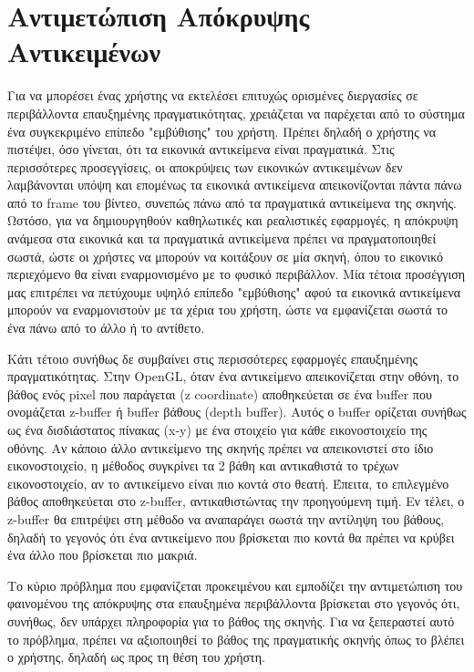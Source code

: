 \section{Αντιμετώπιση Απόκρυψης Αντικειμένων} \label{s:occlusion}



Για να μπορέσει ένας χρήστης να εκτελέσει επιτυχώς ορισμένες διεργασίες σε περιβάλλοντα επαυξημένης πραγματικότητας, χρειάζεται να παρέχεται από το σύστημα ένα συγκεκριμένο επίπεδο "εμβύθισης" του χρήστη. Πρέπει δηλαδή ο χρήστης να πιστέψει, όσο γίνεται, ότι τα εικονικά αντικείμενα είναι πραγματικά. 
Στις περισσότερες προσεγγίσεις, οι αποκρύψεις των εικονικών αντικειμένων δεν λαμβάνονται υπόψη και επομένως τα εικονικά αντικείμενα απεικονίζονται πάντα πάνω από το frame του βίντεο, συνεπώς πάνω από τα πραγματικά αντικείμενα της σκηνής. 
Ωστόσο, για να δημιουργηθούν καθηλωτικές και ρεαλιστικές εφαρμογές, η απόκρυψη ανάμεσα στα εικονικά και τα πραγματικά αντικείμενα πρέπει να πραγματοποιηθεί σωστά, ώστε οι χρήστες να μπορούν να κοιτάξουν σε μία σκηνή, όπου το εικονικό περιεχόμενο θα είναι εναρμονισμένο με το φυσικό περιβάλλον. Μία τέτοια προσέγγιση μας επιτρέπει να πετύχουμε υψηλό επίπεδο "εμβύθισης" αφού τα εικονικά αντικείμενα μπορούν να εναρμονιστούν με τα χέρια του χρήστη, ώστε να εμφανίζεται σωστά το ένα πάνω από το άλλο ή το αντίθετο. 

Κάτι τέτοιο συνήθως δε συμβαίνει στις περισσότερες εφαρμογές επαυξημένης πραγματικότητας. Στην OpenGL, όταν ένα αντικείμενο απεικονίζεται στην οθόνη, το βάθος ενός pixel που παράγεται (z coordinate) αποθηκεύεται σε ένα buffer που ονομάζεται z-buffer ή buffer βάθους (depth buffer). Αυτός ο buffer ορίζεται συνήθως ως ένα δισδιάστατος πίνακας (x-y) με ένα στοιχείο για κάθε εικονοστοιχείο της οθόνης. Αν κάποιο άλλο αντικείμενο της σκηνής πρέπει να απεικονιστεί στο ίδιο εικονοστοιχείο, η μέθοδος συγκρίνει τα 2 βάθη και αντικαθιστά το τρέχων εικονοστοιχείο, αν το αντικείμενο είναι πιο κοντά στο θεατή. Έπειτα, το επιλεγμένο βάθος αποθηκεύεται στο z-buffer, αντικαθιστώντας την προηγούμενη τιμή. Εν τέλει, ο z-buffer θα επιτρέψει στη μέθοδο να αναπαράγει σωστά την αντίληψη του βάθους, δηλαδή το γεγονός ότι ένα αντικείμενο που βρίσκεται πιο κοντά θα πρέπει να κρύβει ένα άλλο που βρίσκεται πιο μακριά.


Το κύριο πρόβλημα που εμφανίζεται προκειμένου και εμποδίζει την αντιμετώπιση του φαινομένου της απόκρυψης στα επαυξημένα περιβάλλοντα βρίσκεται στο γεγονός ότι, συνήθως, δεν υπάρχει πληροφορία για το βάθος της σκηνής. Για να ξεπεραστεί αυτό το πρόβλημα, πρέπει να αξιοποιηθεί το βάθος της πραγματικής σκηνής όπως το βλέπει ο χρήστης, δηλαδή ως προς τη θέση του χρήστη. 

